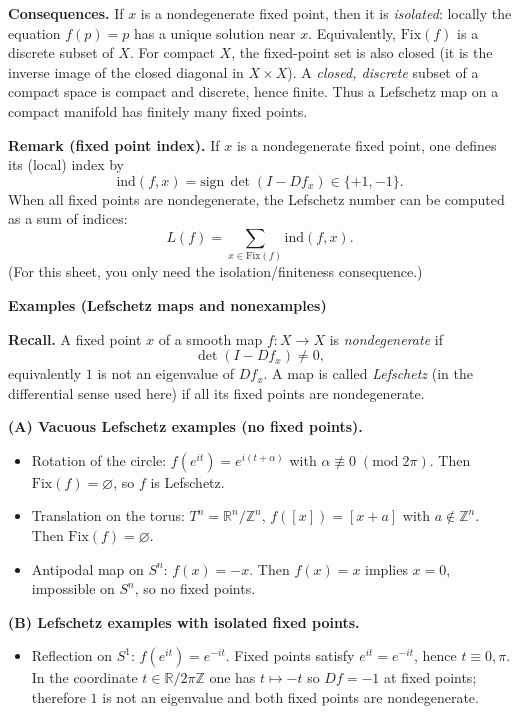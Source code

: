 \begin{solution}
\medskip
\noindent\textbf{Consequences.}
If $x$ is a nondegenerate fixed point, then it is \emph{isolated}:
locally the equation $f(p)=p$ has a unique solution near $x$.
Equivalently, $\mathrm{Fix}(f)$ is a discrete subset of $X$.
For compact $X$, the fixed-point set is also closed (it is the inverse
image of the closed diagonal in $X\times X$). A \emph{closed, discrete}
subset of a compact space is compact and discrete, hence finite.
Thus a Lefschetz map on a compact manifold has finitely many fixed points.

\medskip
\noindent\textbf{Remark (fixed point index).}
If $x$ is a nondegenerate fixed point, one defines its (local) index by
\[
\mathrm{ind}(f,x)=\mathrm{sign}\,\det(I-Df_x)\in\{+1,-1\}.
\]
When all fixed points are nondegenerate, the Lefschetz number can be computed as a sum of indices:
\[
L(f)=\sum_{x\in \mathrm{Fix}(f)} \mathrm{ind}(f,x).
\]
(For this sheet, you only need the isolation/fin\-ite\-ness consequence.)

\par\medskip\noindent\textbf{Examples (Lefschetz maps and nonexamples)}\par\smallskip


\noindent\textbf{Recall.}
A fixed point $x$ of a smooth map $f:X\to X$ is \emph{nondegenerate} if
\[
\det(I-Df_x)\neq 0,
\]
equivalently $1$ is not an eigenvalue of $Df_x$.
A map is called \emph{Lefschetz} (in the differential sense used here) if all its fixed points are nondegenerate.

\medskip
\noindent\textbf{(A) Vacuous Lefschetz examples (no fixed points).}
\begin{itemize}
	\item Rotation of the circle: $f(e^{it})=e^{i(t+\alpha)}$ with $\alpha\not\equiv 0\;(\mathrm{mod}\;2\pi)$.
	Then $\mathrm{Fix}(f)=\varnothing$, so $f$ is Lefschetz.
	\item Translation on the torus: $T^n=\mathbb{R}^n/\mathbb{Z}^n$, $f([x])=[x+a]$ with $a\notin\mathbb{Z}^n$.
	Then $\mathrm{Fix}(f)=\varnothing$.
	\item Antipodal map on $S^n$: $f(x)=-x$. Then $f(x)=x$ implies $x=0$, impossible on $S^n$, so no fixed points.
\end{itemize}

\medskip
\noindent\textbf{(B) Lefschetz examples with isolated fixed points.}
\begin{itemize}
	\item Reflection on $S^1$: $f(e^{it})=e^{-it}$.
	Fixed points satisfy $e^{it}=e^{-it}$, hence $t\equiv 0,\pi$.
	In the coordinate $t\in\mathbb{R}/2\pi\mathbb{Z}$ one has $t\mapsto -t$ so $Df=-1$ at fixed points;
	therefore $1$ is not an eigenvalue and both fixed points are nondegenerate.
	

\end{itemize}
\end{solution}
